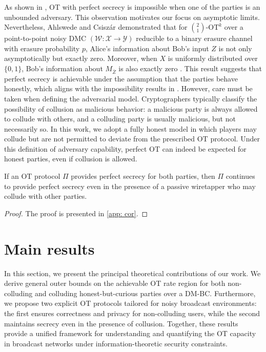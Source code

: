 \documentclass[runningheads]{llncs}
\newcounter{protocol}
\begin{document}
\begin{remark}\label{rem}
   As shown in \cite{Hadi-limit}, OT with perfect secrecy is impossible when one of the parties is an unbounded adversary. This observation motivates our focus on asymptotic limits. Nevertheless, Ahlswede and Csiszár demonstrated that for $\binom{2}{1}\text{-OT}^k$ over a point-to-point noisy DMC $(\mathcal{W}:\mathcal{X}\to\mathcal{Y})$ reducible to a binary erasure channel with erasure probability $p$, Alice’s information about Bob’s input $Z$ is not only asymptotically but exactly zero. Moreover, when $X$ is uniformly distributed over $\{0,1\}$, Bob’s information about $M_{\overline{Z}}$ is also exactly zero \cite[Remark~5]{Rudolf1}. This result suggests that perfect secrecy is achievable under the assumption that the parties behave honestly, which aligns with the impossibility results in \cite{Hadi-limit}. However, care must be taken when defining the adversarial model. Cryptographers typically classify the possibility of collusion as malicious behavior: a malicious party is always allowed to collude with others, and a colluding party is usually malicious, but not necessarily so. In this work, we adopt a fully honest model in which players may collude but are not permitted to deviate from the prescribed OT protocol. Under this definition of adversary capability, perfect OT can indeed be expected for honest parties, even if collusion is allowed.
\end{remark}
\begin{corollary}\label{cor}
    If an OT protocol $\Pi$ provides perfect secrecy for both parties, then $\Pi$ continues to provide perfect secrecy even in the presence of a passive wiretapper who may collude with other parties.
    
\end{corollary}

\begin{proof}
    The proof is presented in \ref{app: cor}.
\end{proof}
\section{Main results}\label{Sec: main}
In this section, we present the principal theoretical contributions of our work. We derive general outer bounds on the achievable OT rate region for both non-colluding and colluding honest-but-curious parties over a DM-BC. Furthermore, we propose two explicit OT protocols tailored for noisy broadcast environments: the first ensures correctness and privacy for non-colluding users, while the second maintains secrecy even in the presence of collusion. Together, these results provide a unified framework for understanding and quantifying the OT capacity in broadcast networks under information-theoretic security constraints.
\end{document}
